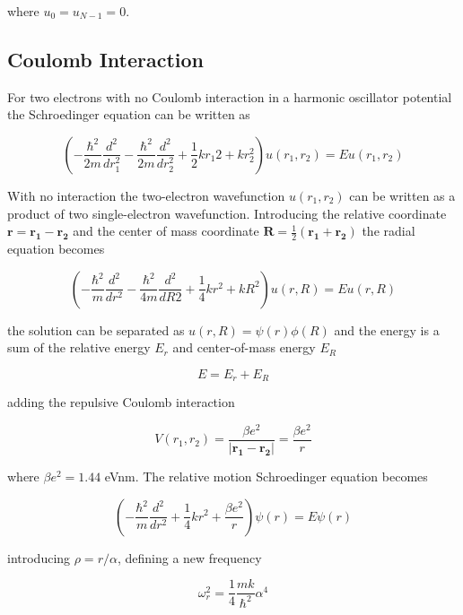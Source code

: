 \documentclass[%
 reprint,
 nobalancelastpage,
 amsmath,amssymb,
 aps,
]{revtex4-1}
\newcommand{\hbarm}{-\frac{\hbar^{2}}{2m}}
\newcommand{\onehalf}{\frac{1}{2}}
\begin{document}
where $u_{0} = u_{N-1} = 0$.

\subsection{Coulomb Interaction}
For two electrons with no Coulomb interaction in a harmonic oscillator potential the Schroedinger equation can be written as

\begin{equation}
	(\hbarm \frac{d^{2}}{dr_{1}^{2}} \hbarm \frac{d^{2}}{dr_{2}^{2}} + \onehalf k r_{1}{2} + k r_{2}^2)u(r_{1}, r_{2}) = Eu(r_{1}, r_{2})
\end{equation}

With no interaction the two-electron wavefunction $u(r_{1}, r_{2})$ can be written as a product of two single-electron wavefunction. Introducing the relative coordinate $\bm{r} = \bm{r_{1} - r_{2}}$ and the center of mass coordinate $\bm{R} = \onehalf (\bm{r_{1} + r_{2}})$ the radial equation becomes

\begin{equation}
	(-\frac{\hbar^{2}}{m}\frac{d^{2}}{dr^{2}} - \frac{\hbar^{2}}{4m} \frac{d^{2}}{dR{2}} + \frac{1}{4}kr^{2} + kR^{2}) u(r, R) = Eu(r, R)
\end{equation}

the solution can be separated as $u(r, R) = \psi(r)\phi(R)$ and the energy is a sum of the relative energy $E_{r}$ and center-of-mass energy $E_{R}$

\begin{equation}
	E = E_{r} + E_{R}
\end{equation}

adding the repulsive Coulomb interaction

\begin{equation}
	V(r_{1}, r_{2}) = \frac{\beta e^{2}}{\left| \bm{r_{1}-r_{2}} \right|} = \frac{\beta e^{2}}{r}
\end{equation}

where $\beta e^{2}  = 1.44$ eVnm. The relative motion Schroedinger equation becomes

\begin{equation}
	(-\frac{\hbar^{2}}{m}\frac{d^{2}}{dr^{2}} + \frac{1}{4}kr^{2} + \frac{\beta e^{2}}{r}) \psi(r) = E\psi(r)
\end{equation}

introducing $\rho = r/\alpha$, defining a new frequency

\begin{equation}
	\omega_{r}^{2} = \frac{1}{4} \frac{mk}{\hbar^{2}} \alpha^{4}
\end{equation}
\end{document}
